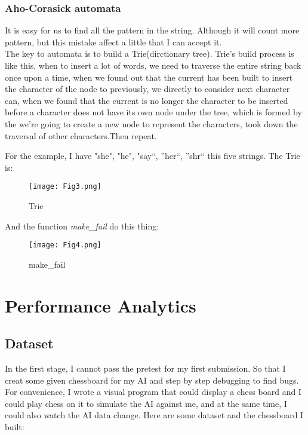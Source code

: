 \documentclass[10pt,twocolumn,letterpaper]{article}
\begin{document}
\subsubsection{Aho-Corasick automata}
It is easy for us to find all the pattern in the string. Although it will count more pattern, but this mistake affect a little that I can accept it.\\

The key to automata is to build a Trie(dirctionary tree). Trie's build process is like this, when to insert a lot of words, we need to traverse the entire string back once upon a time, when we found out that the current has been built to insert the character of the node to previously, we directly to consider next character can, when we found that the current is no longer the character to be inserted before a character does not have its own node under the tree, which is formed by the we're going to create a new node to represent the characters, took down the traversal of other characters.Then repeat.

For the example, I have "she", "he", "say“, ”her“, ”shr“ this five strings. The Trie is:

\begin{figure}[H]
  \centering
  \texttt{[image: Fig3.png]}\\
  \caption{Trie
}\label{straddltimeScale}
\end{figure}

And the function \emph{make\_fail} do this thing:

\begin{figure}[H]
  \centering
  \texttt{[image: Fig4.png]}\\
  \caption{make_fail
}\label{straddltimeScale}
\end{figure}

\section{Performance Analytics}

\subsection{Dataset}
In the first stage, I cannot pass the pretest for my first submission. So that I creat some given chessboard for my AI and step by step debugging to find bugs. For convenience, I wrote a visual program that could display a chess board and I could play chess on it to simulate the AI against me, and at the same time, I could also watch the AI data change. Here are some dataset and the chessboard I built:
\end{document}
